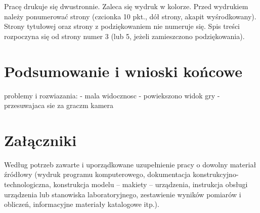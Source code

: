\documentclass[12pt,twoside]{article}
\begin{document}
Pracę drukuje się dwustronnie. Zaleca się wydruk w kolorze. Przed wydrukiem
należy ponumerować strony (czcionka 10 pkt., dół strony, akapit wyśrodkowany). Strony
tytułowej oraz strony z podziękowaniem nie numeruje się. Spis treści rozpoczyna się od
strony numer 3 (lub 5, jeżeli zamieszczono podziękowania).


\fi



\clearpage

\section{Podsumowanie i wnioski końcowe}


problemy i rozwiazania:
- mala widocznosc - powiekszono widok gry - przesuwajaca sie za graczm kamera


\clearpage

\section*{Załączniki}

Według potrzeb zawarte i uporządkowane uzupełnienie pracy o dowolny materiał źródłowy (wydruk programu komputerowego, dokumentacja kons\-truk\-cyj\-no-\-tech\-no\-lo\-gicz\-na, konstrukcja modelu -- makiety -- urządzenia, instrukcja obsługi urządzenia lub stanowiska laboratoryjnego, zestawienie wyników pomiarów i obliczeń, informacyjne materiały katalogowe itp.).


\clearpage

\end{document}
